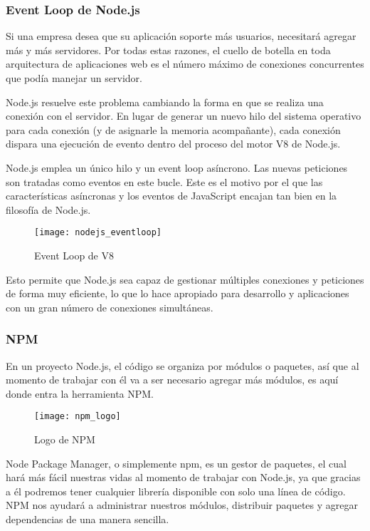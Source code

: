 \subsubsection{Event Loop de Node.js}

Si una empresa desea que su aplicación soporte más usuarios, necesitará agregar más y más servidores. Por todas estas razones, el cuello de botella en toda arquitectura de aplicaciones web es el número máximo de conexiones concurrentes que podía manejar un servidor.

Node.js resuelve este problema cambiando la forma en que se realiza una conexión con el servidor. En lugar de generar un nuevo hilo del sistema operativo para cada conexión (y de asignarle la memoria acompañante), cada conexión dispara una ejecución de evento dentro del proceso del motor V8 de Node.js.

Node.js emplea un único hilo y un event loop asíncrono. Las nuevas peticiones son tratadas como eventos en este bucle. Este es el motivo por el que las características asíncronas y los eventos de JavaScript encajan tan bien en la filosofía de Node.js.

\begin{figure}[htp!]
  \centering
  \texttt{[image: nodejs\_eventloop]}
  \caption{Event Loop de V8}
  \label{fig:nodejs_eventloop}
\end{figure}

Esto permite que Node.js sea capaz de gestionar múltiples conexiones y peticiones de forma muy eficiente, lo que lo hace apropiado para desarrollo y aplicaciones con un gran número de conexiones simultáneas.

\subsubsection{NPM}

En un proyecto Node.js, el código se organiza por módulos o paquetes, así que al momento de trabajar con él va a ser necesario agregar más módulos, es aquí donde entra la herramienta NPM.

\begin{figure}[htp!]
  \centering
  \texttt{[image: npm\_logo]}
  \caption{Logo de NPM}
  \label{fig:npm_logo}
\end{figure}

Node Package Manager, o simplemente npm, es un gestor de paquetes, el cual hará más fácil nuestras vidas al momento de trabajar con Node.js, ya que gracias a él podremos tener cualquier librería disponible con solo una línea de código. NPM nos ayudará a administrar nuestros módulos, distribuir paquetes y agregar dependencias de una manera sencilla.

